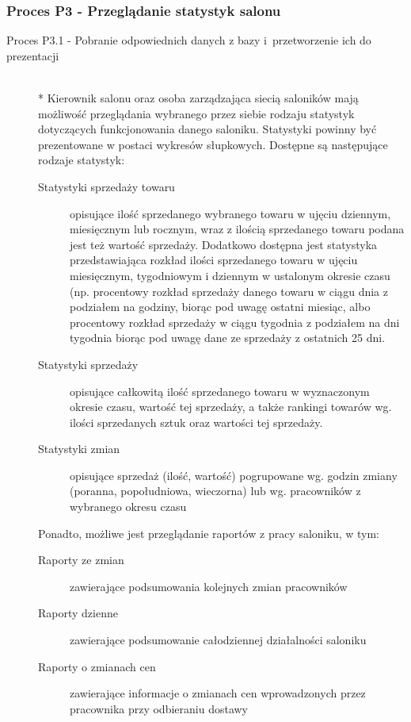 \subsubsection{Proces P3 - Przeglądanie statystyk salonu}
\begin{description}
\item[Proces P3.1 - Pobranie odpowiednich danych z bazy i~przetworzenie ich do prezentacji] ~\\*
Kierownik salonu oraz osoba zarządzająca siecią saloników mają możliwość przeglądania wybranego przez siebie rodzaju statystyk dotyczących funkcjonowania danego saloniku. Statystyki powinny być prezentowane w postaci wykresów słupkowych. Dostępne są następujące rodzaje statystyk:
\begin{description}
\item[Statystyki sprzedaży towaru] opisujące ilość sprzedanego wybranego towaru w ujęciu dziennym, miesięcznym lub rocznym, wraz z ilością sprzedanego towaru podana jest też wartość sprzedaży. Dodatkowo dostępna jest statystyka przedstawiająca rozkład ilości sprzedanego towaru w ujęciu miesięcznym, tygodniowym i dziennym w ustalonym okresie czasu (np. procentowy rozkład sprzedaży danego towaru w ciągu dnia z podziałem na godziny, biorąc pod uwagę ostatni miesiąc, albo procentowy rozkład sprzedaży w ciągu tygodnia z podziałem na dni tygodnia biorąc pod uwagę dane ze sprzedaży z ostatnich 25 dni.
\item[Statystyki sprzedaży] opisujące całkowitą ilość sprzedanego towaru w wyznaczonym okresie czasu, wartość tej sprzedaży, a także rankingi towarów wg. ilości sprzedanych sztuk oraz wartości tej sprzedaży.
\item[Statystyki zmian] opisujące sprzedaż (ilość, wartość) pogrupowane wg. godzin zmiany (poranna, popołudniowa, wieczorna) lub wg. pracowników z wybranego okresu czasu
\end{description}
Ponadto, możliwe jest przeglądanie raportów z pracy saloniku, w tym:
\begin{description}
\item[Raporty ze zmian] zawierające podsumowania kolejnych zmian pracowników
\item[Raporty dzienne] zawierające podsumowanie całodziennej działalności saloniku
\item[Raporty o zmianach cen] zawierające informacje o zmianach cen wprowadzonych przez pracownika przy odbieraniu dostawy
\end{description}
\end{description}
